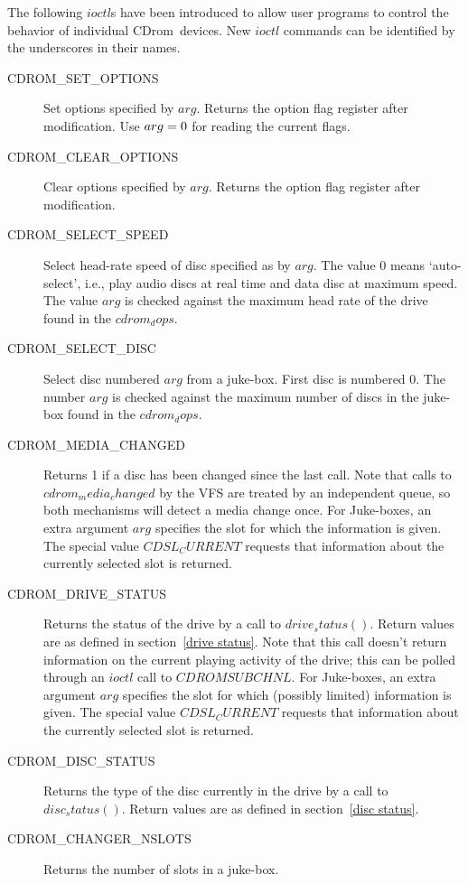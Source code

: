 \documentclass{article}
\def\cdrom{{\sc CDrom}}
\begin{document}
The following $ioctl$s have been introduced to allow user programs to
control the behavior of individual \cdrom\ devices. New $ioctl$
commands can be identified by the underscores in their names.
\begin{description}
\item[CDROM_SET_OPTIONS] Set options specified by $arg$. Returns the
option flag register after modification. Use  $arg = \rm0$ for reading
the current flags.
\item[CDROM_CLEAR_OPTIONS] Clear options specified by $arg$. Returns
  the option flag register after modification.
\item[CDROM_SELECT_SPEED] Select head-rate speed of disc specified as
  by $arg$. The value 0 means `auto-select', i.e., play audio discs at
  real time and data disc at maximum speed. The value $arg$ is
  checked against the maximum head rate of the drive found in
  the $cdrom_dops$.
\item[CDROM_SELECT_DISC] Select disc numbered $arg$ from a juke-box.
  First disc is numbered 0. The number $arg$ is checked against the
  maximum number of discs in the juke-box found in the $cdrom_dops$.
\item[CDROM_MEDIA_CHANGED] Returns 1 if a disc has been changed since
  the last call. Note that calls to $cdrom_media_changed$ by the VFS
  are treated by an independent queue, so both mechanisms will detect
  a media change once. For Juke-boxes, an extra argument $arg$
  specifies the slot for which the information is given. The special
  value $CDSL_CURRENT$ requests that information about the currently
  selected slot is returned.
\item[CDROM_DRIVE_STATUS] Returns the status of the drive by a call to
  $drive_status()$. Return values are as defined in section~\ref{drive
    status}. Note that this call doesn't return information on the
  current playing activity of the drive; this can be polled through an
  $ioctl$ call to $CDROMSUBCHNL$. For Juke-boxes, an extra argument
  $arg$ specifies the slot for which (possibly limited) information is
  given. The special value $CDSL_CURRENT$ requests that information
  about the currently selected slot is returned.
\item[CDROM_DISC_STATUS] Returns the type of the disc currently in the
  drive by a call to $disc_status()$. Return values are as defined in
  section~\ref{disc status}.
\item[CDROM_CHANGER_NSLOTS] Returns the number of slots in a
  juke-box. 
\end{description}
\end{document}
